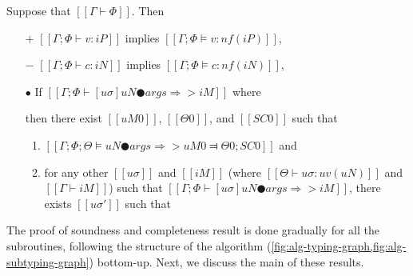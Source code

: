 \begin{theorem*}
    \label{thm:completeness-typing}
    Suppose that $[[Γ ⊢ Φ]]$. Then\footnotemark[1]
    \begin{itemize}
        \item [$+$] $[[Γ; Φ ⊢ v : iP]]$ implies $[[Γ; Φ ⊨ v : nf(iP)]]$,
        \item [$-$] $[[Γ; Φ ⊢ c : iN]]$ implies $[[Γ; Φ ⊨ c : nf(iN)]]$,
        \item [$\bullet$] If $[[Γ; Φ ⊢ [uσ]uN ● args ⇒> iM]]$
            where 
            then there exist $[[uM0]]$, $[[Θ0]]$, and $[[SC0]]$ such that
            \begin{enumerate}
                \item $[[ Γ; Φ; Θ ⊨ uN ● args ⇒> uM0 ⫤ Θ0; SC0 ]]$ and
                \item \label{point:mostGeneral} for any other $[[uσ]]$ and $[[iM]]$ 
                (where $[[Θ ⊢ uσ : uv(uN)]]$ and $[[Γ ⊢ iM]]$)
                    such that $[[Γ; Φ ⊢ [uσ]uN ● args ⇒> iM]]$, 
                    there exists $[[uσ']]$ such that 
            \end{enumerate}
    \end{itemize}
\end{theorem*}



The proof of soundness and completeness result is done gradually
for all the subroutines,
following the structure of the algorithm 
(\cref{fig:alg-typing-graph,fig:alg-subtyping-graph})
bottom-up. Next, we discuss the main of these results. 

